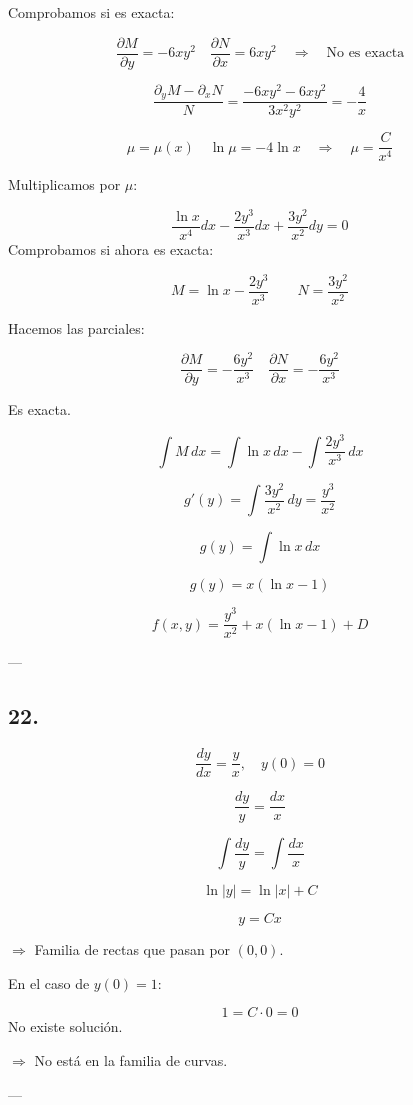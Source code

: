 \documentclass[a4paper,12pt]{article}
\begin{document}
Comprobamos si es exacta:

\[
\frac{\partial M}{\partial y} = -6xy^2 \quad \frac{\partial N}{\partial x} = 6xy^2 \quad \Rightarrow \quad \text{No es exacta}
\]

\[
\frac{\partial_y M - \partial_x N}{N} = \frac{-6xy^2 - 6xy^2}{3x^2 y^2} = -\frac{4}{x}
\]

\[
\mu = \mu(x) \quad \ln \mu = -4 \ln x \quad \Rightarrow \quad \mu = \frac{C}{x^4}
\]

Multiplicamos por $\mu$:

\[
\frac{\ln x}{x^4} dx - \frac{2y^3}{x^3} dx + \frac{3y^2}{x^2} dy = 0
\]
Comprobamos si ahora es exacta:

\[
M = \ln x - \frac{2y^3}{x^3} 
\quad\quad 
N = \frac{3y^2}{x^2}
\]

Hacemos las parciales:

\[
\frac{\partial M}{\partial y} = -\frac{6y^2}{x^3} 
\quad 
\frac{\partial N}{\partial x} = -\frac{6y^2}{x^3}
\]

Es exacta.

\[
\int M\, dx = \int \ln x\, dx - \int \frac{2y^3}{x^3}\, dx
\]

\[
g'(y) = \int \frac{3y^2}{x^2}\, dy = \frac{y^3}{x^2}
\]

\[
g(y) = \int \ln x\, dx
\]

\[
g(y) = x (\ln x - 1)
\]

\[
f(x,y) = \frac{y^3}{x^2} + x(\ln x - 1) + D
\]

---

\subsection*{22.}
\[
\frac{dy}{dx} = \frac{y}{x}, \quad y(0) = 0
\]

\[
\frac{dy}{y} = \frac{dx}{x}
\]

\[
\int \frac{dy}{y} = \int \frac{dx}{x}
\]

\[
\ln |y| = \ln |x| + C
\]

\[
y = Cx
\]

$\Rightarrow$ Familia de rectas que pasan por $(0,0)$.

En el caso de $y(0) = 1$:

\[
1 = C \cdot 0 = 0
\]
No existe solución.

$\Rightarrow$ No está en la familia de curvas.

---
\end{document}
